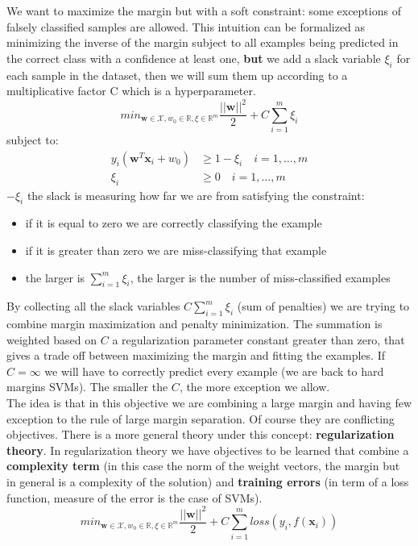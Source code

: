 We want to maximize the margin but with a soft constraint: some exceptions of falsely
classified samples are allowed. This intuition can be formalized as minimizing
the inverse of the margin subject to all examples being predicted in the correct
class with a confidence at least one, \textbf{but} we add a slack variable
$\xi_{i}$ for each sample in the dataset, then we will sum them up according to a
multiplicative factor C which is a hyperparameter.
\[
	min_{\pmb{w} \in \mathcal{X}, w_0 \in \mathbb{R}, \xi \in \mathbb{R}^m}\frac{||\pmb{w}||^{2}}{2}
	+ C\sum_{i=1}^{m}\xi_{i}
\]
subject to:
\begin{align*}
	y_{i}(\pmb{w}^{T}\pmb{x}_{i}+ w_{0}) & \geq 1 - \xi_{i}\quad i = 1, \dots, m \\
	\xi_{i}                              & \geq 0 \quad i = 1, \dots, m
\end{align*}
$- \xi_{i}$ the slack is measuring how far we are from satisfying the constraint:
\begin{itemize}
	\item if it is equal to zero we are correctly classifying the example

	\item if it is greater than zero we are miss-classifying that example

	\item the larger is $\sum_{i=1}^{m}\xi_{i}$, the larger is the number of miss-classified
		examples
\end{itemize}
By collecting all the slack variables $C\sum_{i=1}^{m}\xi_{i}$ (sum of penalties)
we are trying to combine margin maximization and penalty minimization. The summation
is weighted based on $C$ a regularization parameter constant greater than zero,
that gives a trade off between maximizing the margin and fitting the examples. If
$C = \infty$ we will have to correctly predict every example (we are back to
hard margins SVMs). The smaller the $C$, the more exception we allow.\\

The idea is that in this objective we are combining a large margin and having
few exception to the rule of large margin separation. Of course they are conflicting
objectives. There is a more general theory under this concept: \textbf{regularization
theory}. In regularization theory we have objectives to be learned that combine a
\textbf{complexity term} (in this case the norm of the weight vectors, the
margin but in general is a complexity of the solution) and \textbf{training
errors} (in term of a loss function, measure of the error is the case of SVMs).
\[
	min_{\pmb{w} \in \mathcal{X}, w_0 \in \mathbb{R}, \xi \in \mathbb{R}^m}\frac{||\pmb{w}||^{2}}{2}
	+ C\sum_{i=1}^{m}loss(y_{i}, f(\pmb{x}_{i}))
\]

